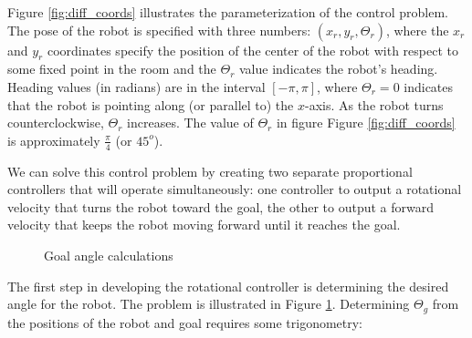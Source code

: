 Figure \ref{fig:diff_coords} illustrates the parameterization of the
control problem.  The pose of the robot is specified with three
numbers: $(x_r, y_r, \Theta_r)$, where the $x_r$ and $y_r$ coordinates
specify the position of the center of the robot with respect to some
fixed point in the room and the $\Theta_r$ value indicates the robot's
heading.  Heading values (in radians) are in the interval $[-\pi,
  \pi]$, where $\Theta_r = 0$ indicates that the robot is pointing
along (or parallel to) the $x$-axis.
As the robot turns counterclockwise, $\Theta_r$ increases.
The value of $\Theta_r$ in figure
Figure \ref{fig:diff_coords} is approximately $\frac{\pi}{4}$ (or
$45^o$).



We can solve this control problem by creating two separate
proportional controllers that will operate simultaneously: one
controller to output a rotational velocity that turns the robot toward
the goal, the other to output a forward velocity that keeps the robot
moving forward until it reaches the goal.


\begin{figure}[h!]
\begin{center}

\end{center}
\caption{Goal angle calculations}
\label{fig:goal_angle}
\end{figure}

The first step in developing the rotational controller is determining
the desired angle for the robot.  The problem is illustrated in Figure
\ref{fig:goal_angle}. Determining $\Theta_g$ from the positions of the
robot and goal requires some trigonometry:

